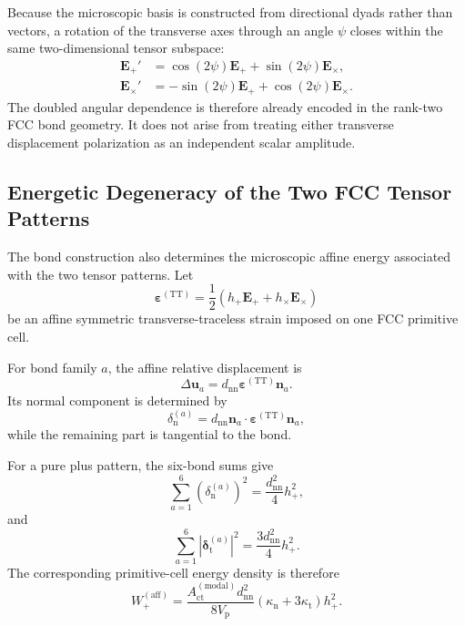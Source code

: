 Because the microscopic basis is constructed from directional dyads rather than vectors, a rotation of the transverse axes through an angle $\psi$ closes within the same two-dimensional tensor subspace:
\begin{align}
    \mathbf{E}_{+}' &= \cos(2\psi)\mathbf{E}_{+} + \sin(2\psi)\mathbf{E}_{\times}, \\
    \mathbf{E}_{\times}' &= -\sin(2\psi)\mathbf{E}_{+} + \cos(2\psi)\mathbf{E}_{\times}.
\end{align}
The doubled angular dependence is therefore already encoded in the rank-two FCC bond geometry. It does not arise from treating either transverse displacement polarization as an independent scalar amplitude.

\subsection{Energetic Degeneracy of the Two FCC Tensor Patterns}
\label{subsec:energetic_degeneracy}

The bond construction also determines the microscopic affine energy associated with the two tensor patterns. Let
\begin{equation}
    \boldsymbol{\varepsilon}^{(\mathrm{TT})} = \frac{1}{2} \left( h_{+}\mathbf{E}_{+} + h_{\times}\mathbf{E}_{\times} \right)
\end{equation}
be an affine symmetric transverse-traceless strain imposed on one FCC primitive cell.

For bond family $a$, the affine relative displacement is
\begin{equation}
    \Delta\mathbf{u}_{a} = d_{\mathrm{nn}} \boldsymbol{\varepsilon}^{(\mathrm{TT})} \mathbf{n}_{a}.
\end{equation}
Its normal component is determined by
\begin{equation}
    \delta_{\mathrm{n}}^{(a)} = d_{\mathrm{nn}} \mathbf{n}_{a} \cdot \boldsymbol{\varepsilon}^{(\mathrm{TT})} \mathbf{n}_{a},
\end{equation}
while the remaining part is tangential to the bond.

For a pure plus pattern, the six-bond sums give
\begin{equation}
    \sum_{a=1}^{6} \left( \delta_{\mathrm{n}}^{(a)} \right)^{2} = \frac{d_{\mathrm{nn}}^{2}}{4} h_{+}^{2},
\end{equation}
and
\begin{equation}
    \sum_{a=1}^{6} \left| \boldsymbol{\delta}_{\mathrm{t}}^{(a)} \right|^{2} = \frac{3d_{\mathrm{nn}}^{2}}{4} h_{+}^{2}.
\end{equation}
The corresponding primitive-cell energy density is therefore
\begin{equation}
    W_{+}^{(\mathrm{aff})} = \frac{A_{\mathrm{ct}}^{(\mathrm{modal})} d_{\mathrm{nn}}^{2}}{8V_{\mathrm{p}}} \left( \kappa_{\mathrm{n}} + 3\kappa_{\mathrm{t}} \right) h_{+}^{2}.
\end{equation}

